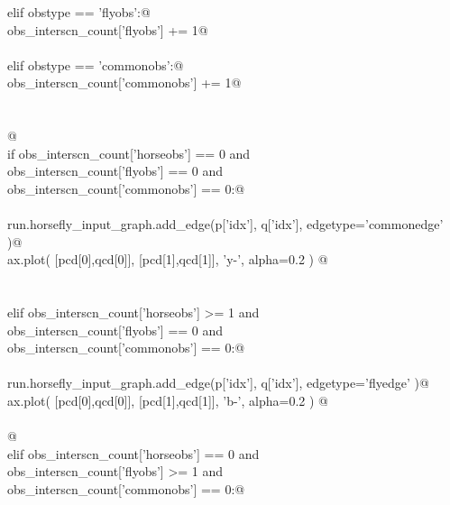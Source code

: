 \documentclass[11.5pt]{report}
\begin{document}
\begin{flushleft}
\begin{minipage}{\linewidth}
\begin{list}{}{}
\mbox{}\verb@                elif obstype == 'flyobs':@\\
\mbox{}\verb@                         obs_interscn_count['flyobs']    += 1@\\
\mbox{}\verb@@\\
\mbox{}\verb@                elif obstype == 'commonobs':@\\
\mbox{}\verb@                         obs_interscn_count['commonobs'] += 1@\\
\mbox{}\verb@@\\
\mbox{}\verb@@\\
\mbox{}\verb@    @\\
\mbox{}\verb@             if   obs_interscn_count['horseobs']   == 0  and \@\\
\mbox{}\verb@                obs_interscn_count['flyobs']     == 0  and \@\\
\mbox{}\verb@                obs_interscn_count['commonobs']  == 0:@\\
\mbox{}\verb@@\\
\mbox{}\verb@                run.horsefly_input_graph.add_edge(p['idx'], q['idx'], edgetype='commonedge' )@\\
\mbox{}\verb@                ax.plot( [pcd[0],qcd[0]], [pcd[1],qcd[1]], 'y-',  alpha=0.2 ) @\\
\mbox{}\verb@@\\
\mbox{}\verb@@\\
\mbox{}\verb@             elif obs_interscn_count['horseobs']  >= 1  and \@\\
\mbox{}\verb@                obs_interscn_count['flyobs']      == 0  and \@\\
\mbox{}\verb@                obs_interscn_count['commonobs']   == 0:@\\
\mbox{}\verb@@\\
\mbox{}\verb@                run.horsefly_input_graph.add_edge(p['idx'], q['idx'], edgetype='flyedge' )@\\
\mbox{}\verb@                ax.plot( [pcd[0],qcd[0]], [pcd[1],qcd[1]], 'b-',  alpha=0.2 ) @\\
\mbox{}\verb@@\\
\mbox{}\verb@    @\\
\mbox{}\verb@             elif obs_interscn_count['horseobs']    == 0  and \@\\
\mbox{}\verb@                 obs_interscn_count['flyobs']      >= 1  and \@\\
\mbox{}\verb@                 obs_interscn_count['commonobs']   == 0:@\\

\end{list}
\end{minipage}
\end{flushleft}
\end{document}
